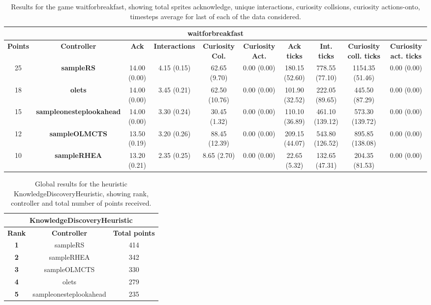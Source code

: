 \begin{table*}[!t]
\begin{center}
\begin{adjustbox}{width=1\textwidth}
\begin{tabular}{|c|c|c|c|c|c|c|c|c|c|}
\multicolumn{10}{c}{\textbf{waitforbreakfast}}\\
\hline
\textbf{Points} & \textbf{Controller} & \textbf{Ack} & \textbf{Interactions} & \textbf{Curiosity Col.} & \textbf{Curiosity Act.} & \textbf{Ack ticks} & \textbf{Int. ticks} & \textbf{Curiosity coll. ticks} & \textbf{Curiosity act. ticks}\\
\hline
25 & \textbf{sampleRS} & 14.00 (0.00) & 4.15 (0.15) & 62.65 (9.70) & 0.00 (0.00) & 180.15 (52.60) & 778.55 (77.10) & 1154.35 (51.46) & 0.00 (0.00)
 \\
\hline
18 & \textbf{olets} & 14.00 (0.00) & 3.45 (0.21) & 62.50 (10.76) & 0.00 (0.00) & 101.90 (32.52) & 222.05 (89.65) & 445.50 (87.29) & 0.00 (0.00)
 \\
\hline
15 & \textbf{sampleonesteplookahead} & 14.00 (0.00) & 3.30 (0.24) & 30.45 (1.32) & 0.00 (0.00) & 110.10 (36.89) & 461.10 (139.12) & 573.30 (139.72) & 0.00 (0.00)
 \\
\hline
12 & \textbf{sampleOLMCTS} & 13.50 (0.19) & 3.20 (0.26) & 88.45 (12.39) & 0.00 (0.00) & 209.15 (44.07) & 543.80 (126.52) & 895.85 (138.08) & 0.00 (0.00)
 \\
\hline
10 & \textbf{sampleRHEA} & 13.20 (0.21) & 2.35 (0.25) & 8.65 (2.70) & 0.00 (0.00) & 22.65 (5.32) & 132.65 (47.31) & 204.35 (81.53) & 0.00 (0.00)
 \\
\hline
\end{tabular}
\end{adjustbox}
\caption{Results for the game waitforbreakfast, showing total sprites acknowledge, unique interactions, curiosity collsions, curiosity actions-onto, timesteps average for last of each of the data considered.}
\label{tab:weights}
\end{center}
\end{table*}
\begin{table*}[!t]
\begin{center}
\begin{tabular}{|c|c|c|}
\multicolumn{3}{c}{\textbf{KnowledgeDiscoveryHeuristic}}\\
\hline
\textbf{Rank} & \textbf{Controller} & \textbf{Total points}\\
\hline
\textbf{1} & sampleRS & 414
 \\
\hline
\textbf{2} & sampleRHEA & 342
 \\
\hline
\textbf{3} & sampleOLMCTS & 330
 \\
\hline
\textbf{4} & olets & 279
 \\
\hline
\textbf{5} & sampleonesteplookahead & 235
 \\
\hline
\end{tabular}
\caption{Global results for the heuristic KnowledgeDiscoveryHeuristic, showing rank, controller and total number of points received.}
\label{tab:weights}
\end{center}
\end{table*}

